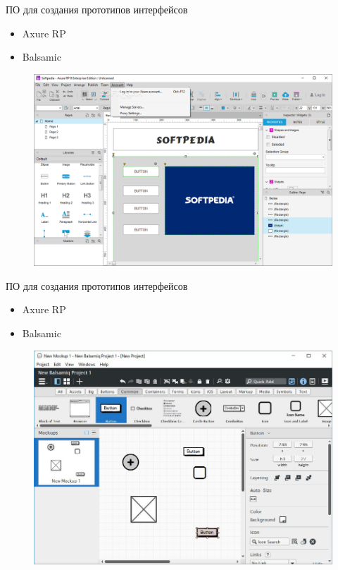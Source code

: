 \documentclass{beamer}
\begin{document}

\begin{frame}[t]{ПО для создания прототипов интерфейсов}
\begin{itemize}
\item Axure RP
\item Balsamic
\end{itemize}
\begin{figure}[h]
\centering
\includegraphics[scale=0.25]{images/axure-1.png}
\end{figure}
\end{frame}

\begin{frame}[t]{ПО для создания прототипов интерфейсов}
\begin{itemize}
\item Axure RP
\item Balsamic
\end{itemize}
\begin{figure}[h]
\centering
\includegraphics[scale=0.25]{images/balsamiq.jpg}
\end{figure}
\end{frame}
\end{document}
